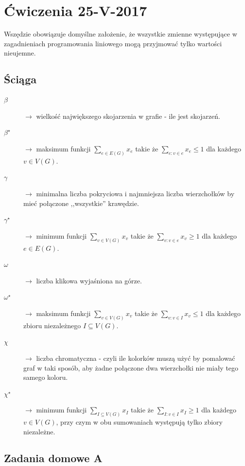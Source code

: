 \section{Ćwiczenia 25-V-2017}

Wszędzie obowiązuje domyślne założenie, że wszystkie zmienne występujące w zagadnieniach programowania liniowego mogą przyjmować tylko wartości nieujemne.
\subsection{Ściąga}
\begin{description}
\item[$\beta $] $\rightarrow$ wielkość największego skojarzenia w grafie - ile jest skojarzeń.
\item[$\beta ^\star$] $\rightarrow$ maksimum funkcji $\sum _{e\in E(G)} x_e$ takie że $\sum _{e:v\in e} x_e\leq 1$ dla każdego $v \in V (G)$.
\item[$\gamma $] $\rightarrow$ minimalna liczba pokryciowa i najmniejsza liczba wierzchołków by mieć połączone ,,wszystkie'' krawędzie.
\item[$\gamma ^\star$] $\rightarrow$ minimum funkcji $\sum _{v\in V(G)} x_v$ takie że $\sum _{v:v\in e} x_v \geq 1$ dla każdego $e \in E(G)$.
\item[$\omega $] $\rightarrow$ liczba klikowa wyjaśniona na górze. 
\item[$\omega ^\star$] $\rightarrow$ maksimum funkcji $\sum _{v\in V(G)} x_v$ takie że $\sum _{v:v\in I} x_v \leq 1$ dla każdego zbioru niezależnego $I \subseteq V(G)$.
\item[$\chi $] $\rightarrow$ liczba chromatyczna - czyli ile kolorków muszą użyć by pomalować graf w taki sposób, aby żadne połączone dwa wierzchołki nie miały tego samego koloru.
\item[$\chi ^\star$] $\rightarrow$ minimum funkcji $\sum _{I\subseteq V(G)} x_I$ takie że $\sum _{I:v\in I} x_I \geq 1$ dla każdego $v \in V(G)$, przy czym w obu sumowaniach występują tylko zbiory niezależne. 
\end{description}

\subsection{Zadania domowe A}

